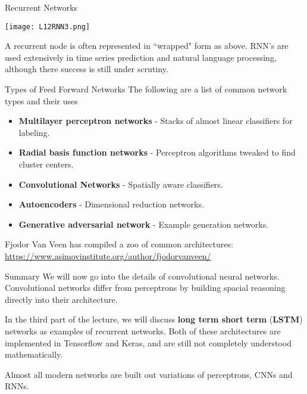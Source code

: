 \documentclass[10pt, table, dvipsnames,xcdraw, handout]{beamer}
\begin{document}
\begin{frame}[fragile]{Recurrent Networks}
  \begin{minipage}[t][0.5\textheight][t]{\textwidth}
	\centering \texttt{[image: L12RNN3.png]} 
  \end{minipage}
  \vfill
\begin{minipage}[t][0.5\textheight][t]{\textwidth}
A recurrent node is often represented in ``wrapped" form as above. RNN's are used extensively in time series prediction and natural language processing, although there success is still under scrutiny. 
\end{minipage}
\end{frame}




\begin{frame}[fragile]{Types of Feed Forward Networks}
The following are a list of common network types and their uses

\begin{itemize}
\item[] \textbf{Multilayer perceptron networks} - Stacks of almost linear classifiers for labeling. \pause
\item[] \textbf{Radial basis function networks} - Perceptron algorithms tweaked to find cluster centers.  \pause
\item[] \textbf{Convolutional Networks} - Spatially aware classifiers.\pause
\item[] \textbf{Autoencoders} - Dimensional reduction networks. \pause
\item[] \textbf{Generative adversarial network} - Example generation networks. \pause
\end{itemize}
Fjodor Van Veen has compiled a zoo of common architectures: 
\url{https://www.asimovinstitute.org/author/fjodorvanveen/}
\end{frame}


\begin{frame}[fragile]{Summary}
We will now go into the details of convolutional neural networks. Convolutional networks differ from perceptrons by building spacial reasoning directly into their architecture. \newline\pause

In the third part of the lecture, we will discuss \textbf{long term short term} (\textbf{LSTM}) networks as examples of recurrent networks. Both of these architectures are implemented in Tensorflow and Keras, and are still not completely understood mathematically. \pause\newline

Almost all modern networks are built out variations of perceptrons, CNNs and RNNs.
\end{frame}
\end{document}
